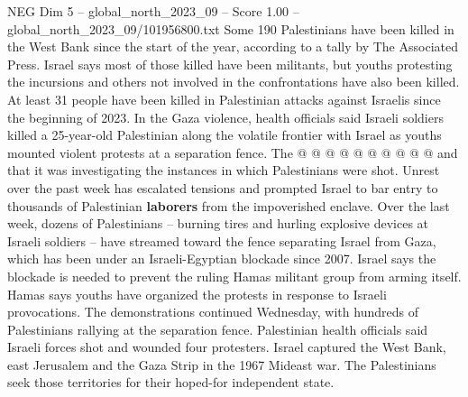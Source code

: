 \begin{textsample}{NEG Dim 5 – global\_north\_2023\_09 – Score 1.00 – global\_north\_2023\_09/101956800.txt}
Some 190 Palestinians have been killed in the West Bank since the start of the year, according to a tally by The Associated Press.
Israel says most of those killed have been militants, but youths protesting the incursions and others not involved in the confrontations have also been killed.
At least 31 people have been killed in Palestinian attacks against Israelis since the beginning of 2023.
In the Gaza violence, health officials said Israeli soldiers killed a 25-year-old Palestinian along the volatile frontier with Israel as youths mounted violent protests at a separation fence.
The @ @ @ @ @ @ @ @ @ @ and that it was investigating the instances in which Palestinians were shot.
Unrest over the past week has escalated tensions and prompted Israel to bar entry to thousands of Palestinian \textbf{laborers} from the impoverished enclave.
Over the last week, dozens of Palestinians -- burning tires and hurling explosive devices at Israeli soldiers -- have streamed toward the fence separating Israel from Gaza, which has been under an Israeli-Egyptian blockade since 2007.
Israel says the blockade is needed to prevent the ruling Hamas militant group from arming itself.
Hamas says youths have organized the protests in response to Israeli provocations.
The demonstrations continued Wednesday, with hundreds of Palestinians rallying at the separation fence.
Palestinian health officials said Israeli forces shot and wounded four protesters.
Israel captured the West Bank, east Jerusalem and the Gaza Strip in the 1967 Mideast war.
The Palestinians seek those territories for their hoped-for independent state.

\end{textsample}
